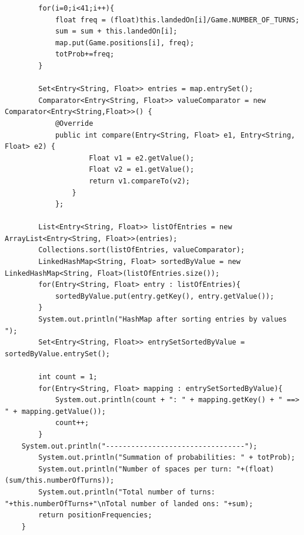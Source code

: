 \documentclass[12pt]{article}
\begin{document}
\begin{lstlisting}
		for(i=0;i<41;i++){
			float freq = (float)this.landedOn[i]/Game.NUMBER_OF_TURNS;
			sum = sum + this.landedOn[i];			
			map.put(Game.positions[i], freq);
			totProb+=freq;
		}
		
		Set<Entry<String, Float>> entries = map.entrySet();
		Comparator<Entry<String, Float>> valueComparator = new Comparator<Entry<String,Float>>() { 
			@Override 
			public int compare(Entry<String, Float> e1, Entry<String, Float> e2) { 
					Float v1 = e2.getValue(); 
					Float v2 = e1.getValue(); 
					return v1.compareTo(v2); 
				} 
			};
			 
		List<Entry<String, Float>> listOfEntries = new ArrayList<Entry<String, Float>>(entries);
		Collections.sort(listOfEntries, valueComparator); 
		LinkedHashMap<String, Float> sortedByValue = new LinkedHashMap<String, Float>(listOfEntries.size());
		for(Entry<String, Float> entry : listOfEntries){ 
			sortedByValue.put(entry.getKey(), entry.getValue()); 
		}
		System.out.println("HashMap after sorting entries by values "); 
		Set<Entry<String, Float>> entrySetSortedByValue = sortedByValue.entrySet(); 
		
		int count = 1;
		for(Entry<String, Float> mapping : entrySetSortedByValue){
			System.out.println(count + ": " + mapping.getKey() + " ==> " + mapping.getValue());
			count++;
		}
	System.out.println("---------------------------------");
		System.out.println("Summation of probabilities: " + totProb);
		System.out.println("Number of spaces per turn: "+(float)(sum/this.numberOfTurns));
		System.out.println("Total number of turns: "+this.numberOfTurns+"\nTotal number of landed ons: "+sum);
		return positionFrequencies;	
	}
\end{lstlisting}
\end{document}
